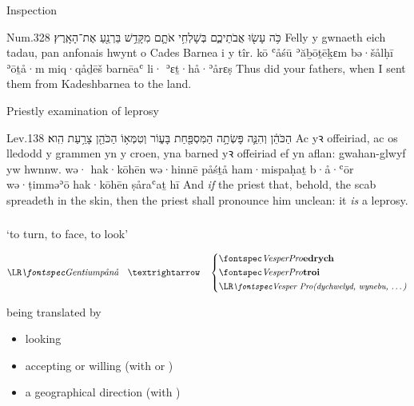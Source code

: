 \begin{frame}{\ex Inspection}
	\begin{example}{Num.}{32}{8}{}{}
		\quoling
		{כֹּ֥ה עָשׂ֖וּ אֲבֹתֵיכֶ֑ם בְּשָׁלְחִ֥י אֹתָ֛ם מִקָּדֵ֥שׁ בַּרְנֵ֖עַ  אֶת־הָאָֽרֶץ׃}
		{Felly y gwnaeth eich tadau, pan anfonais hwynt o Cades Barnea i  y tîr.}
		{kō ʿåśū ʾăḇōṯēḵɛm bə·šålḥī ʾōṯå·m miq·qåḏēš barnēaʿ li· ʾɛṯ·hå·ʾårɛṣ}
		{Thus did your fathers, when I sent them from Kadeshbarnea to  the land.}
	\end{example}
\end{frame}


\begin{frame}{\ex Priestly examination of leprosy}
	\begin{example}{Lev.}{13}{8}{}{}
		\quoling
		{ הַכֹּהֵ֔ן וְהִנֵּ֛ה פָּשְׂתָ֥ה הַמִּסְפַּ֖חַת בָּע֑וֹר וְטִמְּא֥וֹ הַכֹּהֵ֖ן צָרַ֥עַת הִֽוא׃}
		{Ac  yꝛ offeiriad, ac os lledodd y grammen yn y croen, yna barned yꝛ offeiriad ef yn aflan: gwahan-glwyf yw hwnnw.}
		{wə· hak·kōhēn wə·hinnē påśṯå ham·mispaḥaṯ b·å·ʿōr wə·ṭimməʾō hak·kōhēn ṣåraʿaṯ hī}
		{And \emph{if} the priest  that, behold, the scab spreadeth in the skin, then the priest shall pronounce him unclean: it \emph{is} a leprosy.}
	\end{example}
\end{frame}



\subsubsection{}

\begin{frame}{ ‘to turn, to face, to look’}
	\begin{center}
		$$
		\mtext{\bh{pånå}} \transto
		\begin{dcases}
			\C{\hl{edrych}}\\
			\C{\hl{troi}}\\
			\mtext{\small\C{(dychwelyd, wynebu, …)}}
		\end{dcases}
		$$
	\end{center}
\end{frame}


\begin{frame}{ being translated by }
	\begin{itemize}
		\item looking\hfill{}
		\item accepting or willing {\small (with  or )}\hfill{}
		\item a geographical direction {\small (with )}\hfill{}
	\end{itemize}
\end{frame}


